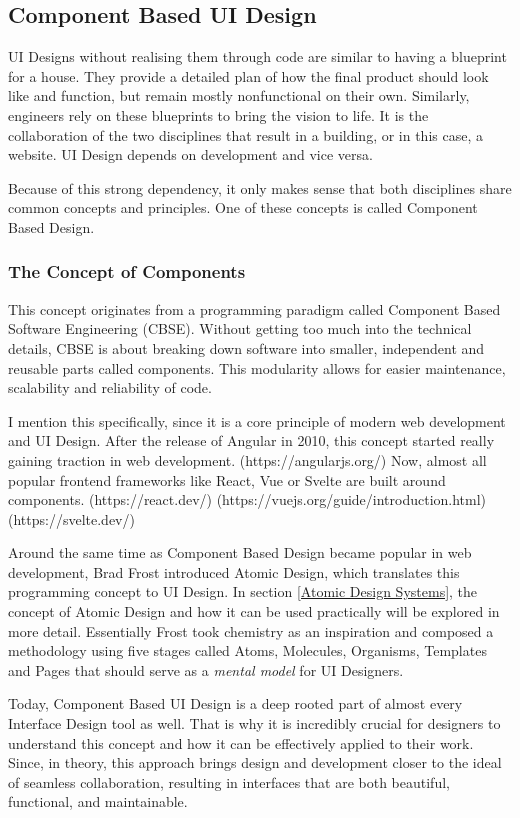 \newpage
\subsection{Component Based UI Design}
UI Designs without realising them through code are similar to having a blueprint for a house. They
provide a detailed plan of how the final product should look like and function, but remain mostly
nonfunctional on their own. Similarly, engineers rely on these blueprints to bring the vision to
life. It is the collaboration of the two disciplines that result in a building, or in this case, a
website. UI Design depends on development and vice versa. 

Because of this strong dependency, it only makes sense that both disciplines share common concepts
and principles. One of these concepts is called Component Based Design.

\subsubsection{The Concept of Components}
This concept originates from a programming paradigm called Component Based Software Engineering
(CBSE). Without getting too much into the technical details, CBSE is about breaking down software
into smaller, independent and reusable parts called components. This modularity allows for easier
maintenance, scalability and reliability of code.

I mention this specifically, since it is a core principle of modern web development and UI Design.
After the release of Angular in 2010, this concept started really gaining traction in web development.
(https://angularjs.org/)
Now, almost all popular frontend frameworks like React, Vue or Svelte are built around components.
(https://react.dev/) (https://vuejs.org/guide/introduction.html) (https://svelte.dev/)

Around the same time as Component Based Design became popular in web development, Brad Frost
introduced Atomic Design, which translates this programming concept to UI Design. In section
\ref{Atomic Design Systems}, the concept of Atomic Design and how it can be used practically will be
explored in more detail. Essentially Frost took chemistry as an inspiration and composed a methodology
using five stages called Atoms, Molecules, Organisms, Templates and Pages that should serve as a
\textit{mental model} for UI Designers. 

Today, Component Based UI Design is a deep rooted part of almost every Interface Design tool as
well. That is why it is incredibly crucial for designers to understand this concept and how it can
be effectively applied to their work. Since, in theory, this approach brings design and development
closer to the ideal of seamless collaboration, resulting in interfaces that are both beautiful,
functional, and maintainable.